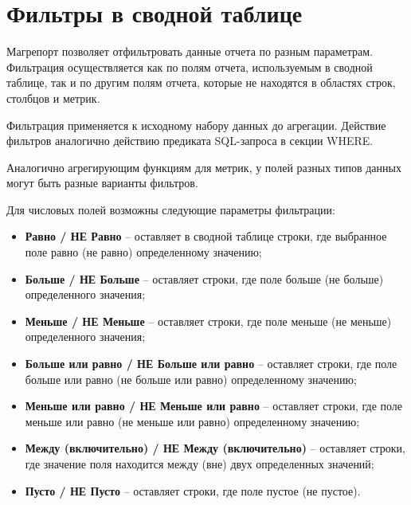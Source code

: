 \documentclass[../user-manual.tex]{subfiles}
\begin{document}
	\section{Фильтры в сводной таблице}
	
	Магрепорт позволяет отфильтровать данные отчета по разным параметрам. Фильтрация осуществляется как по полям отчета, используемым в сводной таблице, так и по другим полям отчета, которые не находятся в областях строк, столбцов и метрик.
	
	Фильтрация применяется к исходному набору данных до агрегации. Действие фильтров аналогично действию предиката SQL-запроса в секции WHERE. 
	
	Аналогично агрегирующим функциям для метрик, у полей разных типов данных могут быть разные варианты фильтров.

	Для числовых полей возможны следующие параметры фильтрации:
	
	\begin{itemize}
		
		\item \textbf{Равно / НЕ Равно} -- оставляет в сводной таблице строки, где выбранное поле равно (не равно) определенному значению;
		
		\item \textbf{Больше / НЕ Больше} -- оставляет строки, где поле больше (не больше) определенного значения;
		
		\item \textbf{Меньше / НЕ Меньше} -- оставляет строки, где поле меньше (не меньше) определенного значения;
		
		\item \textbf{Больше или равно / НЕ Больше или равно} -- оставляет строки, где поле больше или равно (не больше или равно) определенному значению;
		
		\item \textbf{Меньше или равно / НЕ Меньше или равно} -- оставляет строки, где поле меньше или равно (не меньше или равно) определенному значению;
		
		\item \textbf{Между (включительно) / НЕ Между (включительно)} -- оставляет строки, где значение поля находится между (вне) двух определенных значений;
		
		\item \textbf{Пусто / НЕ Пусто} -- оставляет строки, где поле пустое (не пустое).
		
	\end{itemize}
	
\end{document}
